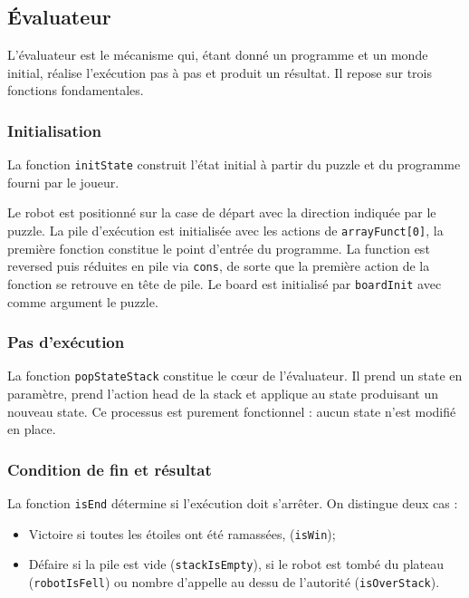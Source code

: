\subsection{Évaluateur}

L'évaluateur est le mécanisme qui, étant donné un programme et un monde initial, réalise l'exécution pas à pas et produit un résultat. Il repose sur trois fonctions fondamentales.

\subsubsection{Initialisation}

La fonction \texttt{initState} construit l'état initial à partir du puzzle et du programme fourni par le joueur. 

Le robot est positionné sur la case de départ avec la direction indiquée par le puzzle. La pile d'exécution est initialisée avec les actions de \texttt{arrayFunct[0]}, la première fonction constitue le point d'entrée du programme. La function est reversed puis réduites en pile via \texttt{cons}, de sorte que la première action de la fonction se retrouve en tête de pile. Le board est initialisé par \texttt{boardInit} avec comme argument le puzzle.

\subsubsection{Pas d'exécution}

La fonction \texttt{popStateStack} constitue le cœur de l'évaluateur. Il prend un state en paramètre, prend l'action head de la stack et applique au state produisant un nouveau state. Ce processus est purement fonctionnel : aucun state n'est modifié en place.

\subsubsection{Condition de fin et résultat}

La fonction \texttt{isEnd} détermine si l'exécution doit s'arrêter. On distingue deux cas :
\begin{itemize} 
\item Victoire si toutes les étoiles ont été ramassées, (\texttt{isWin});
\item Défaire si la pile est vide (\texttt{stackIsEmpty}), si le robot est tombé du plateau (\texttt{robotIsFell}) ou nombre d’appelle au dessu de l’autorité (\texttt{isOverStack}). 
\end{itemize}

